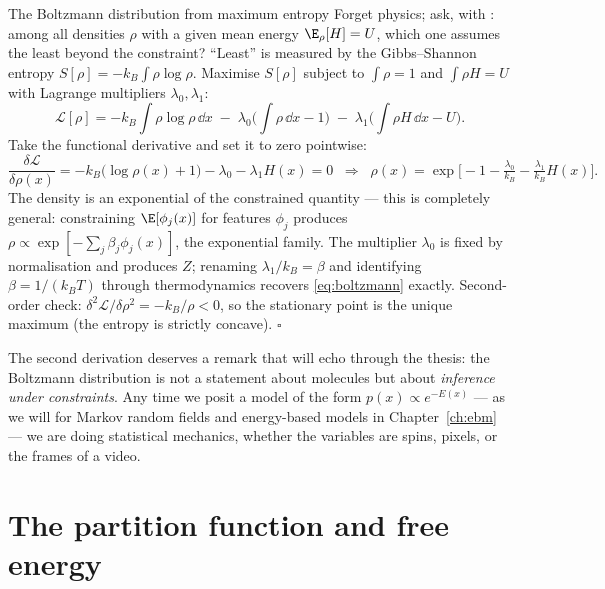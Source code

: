 \begin{toolbox}[tb:maxent]{The Boltzmann distribution from maximum entropy}
Forget physics; ask, with \citet{jaynes1957information}: among all densities
$\rho$ with a given mean energy $\E_\rho[H] = U$, which one assumes the least
beyond the constraint? ``Least'' is measured by the Gibbs--Shannon entropy
$S[\rho] = -k_B \int \rho \log \rho$. Maximise $S[\rho]$ subject to
$\int \rho = 1$ and $\int \rho H = U$ with Lagrange multipliers
$\lambda_0, \lambda_1$:
\begin{equation*}
  \mathcal{L}[\rho]
  = -k_B \!\int\! \rho \log \rho \,\dd x
  \;-\; \lambda_0 \Big( \!\int\! \rho \,\dd x - 1 \Big)
  \;-\; \lambda_1 \Big( \!\int\! \rho H \,\dd x - U \Big).
\end{equation*}
Take the functional derivative and set it to zero pointwise:
\begin{equation*}
  \frac{\delta \mathcal{L}}{\delta \rho(x)}
  = -k_B\big(\log \rho(x) + 1\big) - \lambda_0 - \lambda_1 H(x) = 0
  \;\;\Longrightarrow\;\;
  \rho(x) = \exp\!\Big[-1 - \tfrac{\lambda_0}{k_B} - \tfrac{\lambda_1}{k_B} H(x)\Big].
\end{equation*}
The density is an exponential of the constrained quantity --- this is
completely general: constraining $\E[\phi_j(x)]$ for features $\phi_j$
produces $\rho \propto \exp[-\sum_j \beta_j \phi_j(x)]$, the exponential
family. The multiplier $\lambda_0$ is fixed by normalisation and produces
$Z$; renaming $\lambda_1/k_B = \beta$ and identifying $\beta = 1/(k_B T)$
through thermodynamics recovers \eqref{eq:boltzmann} exactly. Second-order
check: $\delta^2 \mathcal{L} / \delta \rho^2 = -k_B/\rho < 0$, so the
stationary point is the unique maximum (the entropy is strictly concave).
\hfill$\square$
\end{toolbox}

The second derivation deserves a remark that will echo through the thesis:
the Boltzmann distribution is not a statement about molecules but about
\emph{inference under constraints}. Any time we posit a model of the form
$p(x) \propto e^{-E(x)}$ --- as we will for Markov random fields and
energy-based models in Chapter~\ref{ch:ebm} --- we are doing statistical
mechanics, whether the variables are spins, pixels, or the frames of a video.

\section{The partition function and free energy}\label{sec:free-energy}

